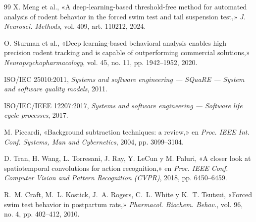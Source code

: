 \documentclass[conference,letterpaper]{IEEEtran}
\begin{document}
\begin{thebibliography}{99}
 X. Meng et al., «A deep-learning-based threshold-free method for automated
analysis of rodent behavior in the forced swim test and tail suspension test,» \textit{J.
Neurosci. Methods}, vol. 409, art. 110212, 2024.

 O. Sturman et al., «Deep learning-based behavioral analysis enables high
precision rodent tracking and is capable of outperforming commercial solutions,»
\textit{Neuropsychopharmacology}, vol. 45, no. 11, pp. 1942--1952, 2020.

 ISO/IEC 25010:2011, \textit{Systems and software engineering --- SQuaRE
--- System and software quality models}, 2011.

 ISO/IEC/IEEE 12207:2017, \textit{Systems and software engineering ---
Software life cycle processes}, 2017.

 M. Piccardi, «Background subtraction techniques: a review,» en
\textit{Proc. IEEE Int. Conf. Systems, Man and Cybernetics}, 2004, pp. 3099--3104.

 D. Tran, H. Wang, L. Torresani, J. Ray, Y. LeCun y M. Paluri, «A closer look
at spatiotemporal convolutions for action recognition,» en \textit{Proc. IEEE Conf. Computer
Vision and Pattern Recognition (CVPR)}, 2018, pp. 6450--6459.

 R.~M. Craft, M.~L. Kostick, J.~A. Rogers, C.~L. White y K.~T. Tsutsui,
«Forced swim test behavior in postpartum rats,» \textit{Pharmacol. Biochem. Behav.},
vol. 96, no. 4, pp. 402--412, 2010.

\end{thebibliography}
\end{document}

